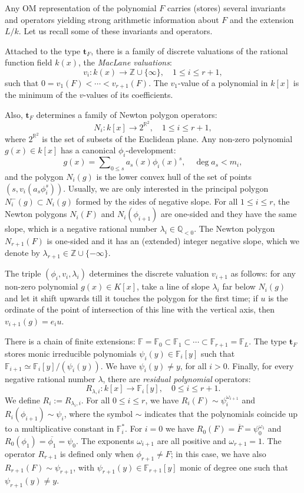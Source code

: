 \documentclass{amsart}
\begin{document}
Any OM representation of the polynomial $F$ carries (stores) several invariants and operators yielding strong arithmetic information about $F$ and the extension $L/k$.
Let us recall some of these invariants and operators.

Attached to the type ${\mathbf{t}}_F$, there is a family of discrete valuations of the rational function field $k(x)$, the \emph{MacLane valuations}:
$$
v_i\colon k(x)\longrightarrow {\mathbb Z}\cup\{\infty\},\quad 1\le i\le r+1,
$$
such that $0=v_1(F)<\cdots<v_{r+1}(F)$. The $v_1$-value of a polynomial in $k[x]$ is the minimum of the $v$-values of its coefficients.

Also, ${\mathbf{t}}_F$ determines a family of Newton polygon operators:
$$
N_i\colon k[x]\longrightarrow 2^{{\mathbb R}^2},\quad 1\le i\le r+1,
$$where $2^{{\mathbb R}^2}$ is the set of subsets of the Euclidean plane. Any non-zero polynomial $g(x)\in k[x]$ has a canonical $\phi_i$-development:
$$
g(x)=\sum\nolimits_{0\le s}a_s(x)\phi_i(x)^s,\quad \deg a_s<m_i,
$$ and the polygon $N_i(g)$ is the lower convex hull of the set of points $(s,v_i(a_s\phi_i^s))$. Usually, we are only interested in the principal polygon $N_i^-(g)\subset N_i(g)$ formed by the sides of negative slope. For all $1\le i\le r$, the Newton polygons $N_i(F)$ and $N_i(\phi_{i+1})$ are one-sided and they have the same slope, which is a negative rational number $\lambda_i\in{\mathbb Q}_{<0}$.  
The Newton polygon $N_{r+1}(F)$ is one-sided and it has an (extended) integer negative slope, which we denote by $\lambda_{r+1}\in{\mathbb Z}\cup\{-\infty\}$.  

The triple $(\phi_i,v_i,\lambda_i)$ determines the discrete valuation $v_{i+1}$ as follows: for any  non-zero polynomial $g(x)\in K[x]$,
take a line of slope $\lambda_i$ far below $N_i(g)$ and let it shift upwards till it touches the polygon for the first time;
if $u$ is the ordinate of the point of intersection of this line with the vertical axis, then $v_{i+1}(g)=e_i u$.

There is a chain of finite extensions: ${\mathbb F}={\mathbb F}_0\subset {\mathbb F}_1\subset\cdots\subset{\mathbb F}_{r+1}={\mathbb F}_L$. The type ${\mathbf{t}}_F$ stores monic irreducible polynomials $\psi_i(y)\in{\mathbb F}_i[y]$ such that ${\mathbb F}_{i+1}\simeq {\mathbb F}_i[y]/(\psi_i(y))$. We have $\psi_i(y)\ne y$, for all $i>0$. Finally, for every negative rational number $\lambda$, there are \emph{residual polynomial} operators:
$$
R_{\lambda,i}\colon k[x] \longrightarrow {\mathbb F}_i[y],\quad 0\le i\le r+1.
$$ 
We define $R_i:=R_{\lambda_i,i}$. For all $0\le i\le r$, we have $R_i(F)\sim \psi_i^{\omega_{i+1}}$ and $R_i(\phi_{i+1})\sim\psi_i$, where the symbol $\sim$ indicates that the polynomials coincide up to a multiplicative constant in ${\mathbb F}_i^*$. For $i=0$ we have $R_0(F)=\overline{F}=\psi_0^{\omega_1}$ and $R_0(\phi_1)=\overline{\phi_1}=\psi_0$. The exponents $\omega_{i+1}$ are all positive and $\omega_{r+1}=1$. The operator $R_{r+1}$ is defined only when $\phi_{r+1}\ne F$; in this case, we have also $R_{r+1}(F)\sim \psi_{r+1}$, with $\psi_{r+1}(y)\in{\mathbb F}_{r+1}[y]$ monic of degree one such that $\psi_{r+1}(y)\ne y$. 
\end{document}
